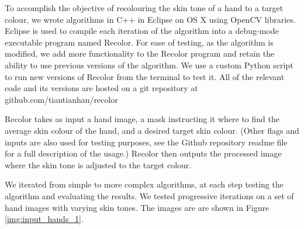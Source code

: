 To accomplish the objective of recolouring the skin tone of a hand to a target colour, we wrote algorithms in C++ in Eclipse on OS X using OpenCV libraries. Eclipse is used to compile each iteration of the algorithm into a debug-mode executable program named Recolor. For ease of testing, as the algorithm is modified, we add more functionality to the Recolor program and retain the ability to use previous versions of the algorithm. We use a custom Python script to run new versions of Recolor from the terminal to test it. All of the relevant code and its versions are hosted on a git repository at github.com/tiantianhan/recolor

Recolor takes as input a hand image, a mask instructing it where to find the average skin colour of the hand, and a desired target skin colour. (Other flags and inputs are also used for testing purposes, see the Github repository readme file for a full description of the usage.) Recolor then outputs the processed image where the skin tone is adjusted to the target colour.

We iterated from simple to more complex algorithms, at each step testing the algorithm and evaluating the results. We tested progressive iterations on a set of hand images with varying skin tones. The images are are shown in Figure \ref{img:input_hands_1}.


